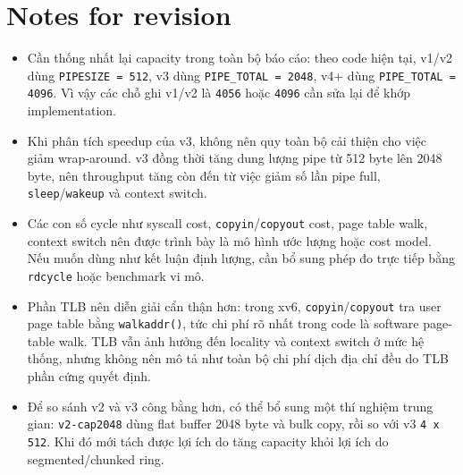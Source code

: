 \documentclass[11pt,a4paper]{article}
\begin{document}
\section{Notes for revision}

\begin{itemize}
  \item Cần thống nhất lại capacity trong toàn bộ báo cáo: theo code hiện tại, v1/v2 dùng \texttt{PIPESIZE = 512}, v3 dùng \texttt{PIPE\_TOTAL = 2048}, v4+ dùng \texttt{PIPE\_TOTAL = 4096}. Vì vậy các chỗ ghi v1/v2 là \texttt{4056} hoặc \texttt{4096} cần sửa lại để khớp implementation.
  \item Khi phân tích speedup của v3, không nên quy toàn bộ cải thiện cho việc giảm wrap-around. v3 đồng thời tăng dung lượng pipe từ 512 byte lên 2048 byte, nên throughput tăng còn đến từ việc giảm số lần pipe full, \texttt{sleep}/\texttt{wakeup} và context switch.
  \item Các con số cycle như syscall cost, \texttt{copyin}/\texttt{copyout} cost, page table walk, context switch nên được trình bày là mô hình ước lượng hoặc cost model. Nếu muốn dùng như kết luận định lượng, cần bổ sung phép đo trực tiếp bằng \texttt{rdcycle} hoặc benchmark vi mô.
  \item Phần TLB nên diễn giải cẩn thận hơn: trong xv6, \texttt{copyin}/\texttt{copyout} tra user page table bằng \texttt{walkaddr()}, tức chi phí rõ nhất trong code là software page-table walk. TLB vẫn ảnh hưởng đến locality và context switch ở mức hệ thống, nhưng không nên mô tả như toàn bộ chi phí dịch địa chỉ đều do TLB phần cứng quyết định.
  \item Để so sánh v2 và v3 công bằng hơn, có thể bổ sung một thí nghiệm trung gian: \texttt{v2-cap2048} dùng flat buffer 2048 byte và bulk copy, rồi so với v3 \texttt{4 x 512}. Khi đó mới tách được lợi ích do tăng capacity khỏi lợi ích do segmented/chunked ring.
\end{itemize}
\end{document}
